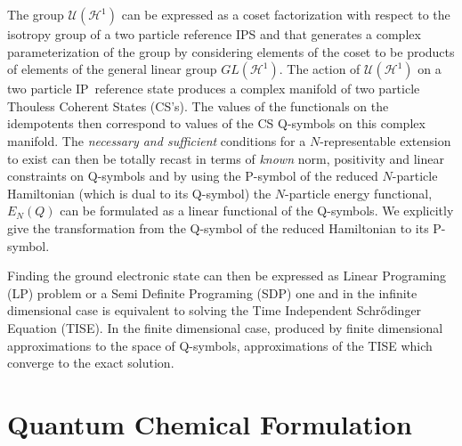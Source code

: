 \documentclass[aps,preprint]{revtex4}%
\begin{document}
The group $\mathcal{U}\left(  \mathcal{H}^{1}\right)  $ can be expressed as a
coset factorization with respect to the isotropy group of a two particle
reference IPS and that generates a complex parameterization of the group by
considering elements of the coset to be products of elements of the general
linear group $GL\left(  \mathcal{H}^{1}\right)  $. The action of
$\mathcal{U}\left(  \mathcal{H}^{1}\right)  $ on a two particle IP\ reference
state produces a complex manifold of two particle Thouless Coherent States
(CS's). The values of the functionals on the idempotents then correspond to
values of the CS Q-symbols on this complex manifold. The \emph{necessary and
sufficient }conditions for a $N$-representable extension to exist can then be
totally recast in terms of \emph{known }norm, positivity and linear
constraints on Q-symbols and by using the P-symbol of the reduced $N$-particle
Hamiltonian (which is dual to its Q-symbol) the $N$-particle energy
functional, $E_{N}\left(  Q\right)  $ can be formulated as a linear functional
of the Q-symbols. We explicitly give the transformation from the Q-symbol of
the reduced Hamiltonian to its P-symbol.

Finding the ground electronic state can then be expressed as Linear Programing
(LP) problem or a Semi Definite Programing (SDP) one and in the infinite
dimensional case is equivalent to solving the Time Independent Schr\H{o}dinger
Equation (TISE). In the finite dimensional case, produced by finite
dimensional approximations to the space of Q-symbols, approximations of the
TISE which converge to the exact solution.

\section{Quantum Chemical Formulation}
\end{document}
